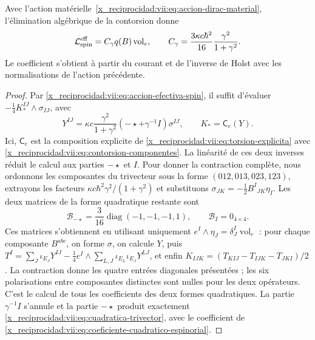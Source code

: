 \begin{theorem}
\label{x_reciprocidad:vii:thm:coeficiente-torsional-espinorial}
Avec l'action matérielle~\eqref{x_reciprocidad:vii:eq:accion-dirac-material},
l'élimination algébrique de la contorsion donne
\begin{equation}
 \mathcal L_{\rm spin}^{\rm eff}
 =C_\gamma q(B)\operatorname{vol}_e,\qquad
 C_\gamma=\frac{3\kappa c\hbar^2}{16}
                      \frac{\gamma^2}{1+\gamma^2}.
 \label{x_reciprocidad:vii:eq:coeficiente-cuadratico-espinorial}
\end{equation}
Le coefficient s'obtient à partir du courant et de l'inverse de Holst
avec les normalisations de l'action précédente.
\end{theorem}
\begin{proof}
Par \eqref{x_reciprocidad:vii:eq:accion-efectiva-spin}, il suffit d'évaluer \(-\frac14K_*^{IJ}\wedge\sigma_{IJ}\), avec
\[
 Y^{IJ}=\kappa c\frac{\gamma^2}{1+\gamma^2}
           (-\star+\gamma^{-1}I)\sigma^{IJ},\qquad
 K_*=\mathsf C_e(Y).
\]
Ici, \(\mathsf C_e\) est la composition explicite de
\eqref{x_reciprocidad:vii:eq:torsion-explicita} avec
\eqref{x_reciprocidad:vii:eq:contorsion-componentes}. La linéarité de ces deux
inverses réduit le calcul aux parties \(-\star\) et \(I\).
Pour donner la contraction complète, nous ordonnons les composantes du
trivecteur sous la forme \((012,013,023,123)\), extrayons les facteurs
\(\kappa c\hbar^2\gamma^2/(1+\gamma^2)\) et substituons
\(\sigma_{JK}=-\frac12B^I{}_{JK}\eta_I\). Les deux matrices
de la forme quadratique restante sont
\begin{equation}
 \mathcal B_{-\star}
 =\frac3{16}\operatorname{diag}(-1,-1,-1,1),\qquad
 \mathcal B_I=0_{4\times4}.
 \label{x_reciprocidad:vii:eq:matrices-contraccion-espinorial}
\end{equation}
Ces matrices s'obtiennent en utilisant uniquement \(e^I\wedge\eta_J=\delta_J^I\operatorname{vol}_e\) : pour chaque composante \(B^{abc}\), on forme \(\sigma\), on calcule \(Y\), puis \(T^I=\sum_J\iota_{E_J}Y^{IJ}
 -\frac14e^I\wedge\sum_{L,J}\iota_{E_L}\iota_{E_J}Y^{LJ}\), et enfin \(K_{IJK}=(T_{KIJ}-T_{IJK}-T_{JKI})/2\). La contraction donne les quatre entrées diagonales présentées ; les six polarisations entre composantes distinctes sont nulles pour les deux opérateurs. C'est le calcul de tous les coefficients des deux formes quadratiques. La partie \(\gamma^{-1}I\) s'annule et la partie \(-\star\) produit exactement \eqref{x_reciprocidad:vii:eq:cuadratica-trivector}, avec le coefficient de \eqref{x_reciprocidad:vii:eq:coeficiente-cuadratico-espinorial}.
\end{proof}

